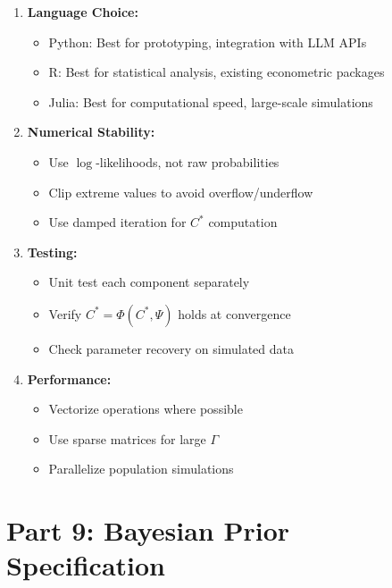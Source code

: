 \begin{tcolorbox}[colback=green!5!white, colframe=green!75!black,
    title=Implementation Guidelines]
\begin{enumerate}
\item \textbf{Language Choice:}
\begin{itemize}[nosep]
\item Python: Best for prototyping, integration with LLM APIs
\item R: Best for statistical analysis, existing econometric packages
\item Julia: Best for computational speed, large-scale simulations
\end{itemize}

\item \textbf{Numerical Stability:}
\begin{itemize}[nosep]
\item Use $\log$-likelihoods, not raw probabilities
\item Clip extreme values to avoid overflow/underflow
\item Use damped iteration for $C^*$ computation
\end{itemize}

\item \textbf{Testing:}
\begin{itemize}[nosep]
\item Unit test each component separately
\item Verify $C^* = \Phi(C^*, \Psi)$ holds at convergence
\item Check parameter recovery on simulated data
\end{itemize}

\item \textbf{Performance:}
\begin{itemize}[nosep]
\item Vectorize operations where possible
\item Use sparse matrices for large $\Gamma$
\item Parallelize population simulations
\end{itemize}
\end{enumerate}
\end{tcolorbox}


\section{Part 9: Bayesian Prior Specification}
\label{sec:az-priors}


